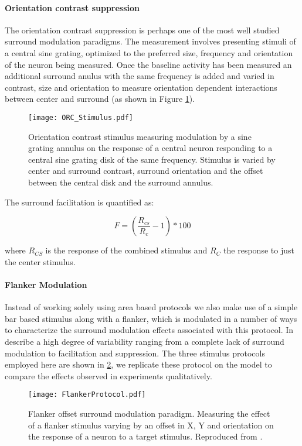 \paragraph{Orientation contrast suppression}

The orientation contrast suppression is perhaps one of the most well
studied surround modulation paradigms. The measurement involves
presenting stimuli of a central sine grating, optimized to the
preferred size, frequency and orientation of the neuron being
measured. Once the baseline activity has been measured an additional
surround anulus with the same frequency is added and varied in
contrast, size and orientation to measure orientation dependent
interactions between center and surround (as shown in Figure
\ref{ORC_Stimulus}).

\begin{figure}
	\centering
        \texttt{[image: ORC\_Stimulus.pdf]}
	\caption{Orientation contrast stimulus measuring modulation by a
      sine grating annulus on the response of a central neuron
      responding to a central sine grating disk of the same frequency.
      Stimulus is varied by center and surround contrast, surround
      orientation and the offset between the central disk and the
      surround annulus.}
	\label{ORC_Stimulus}
\end{figure}

The surround facilitation is quantified as:

\begin{equation}
F = (\frac{R_{cs}}{R_c} - 1) * 100
\end{equation}

where $R_{CS}$ is the response of the combined stimulus and $R_C$ the
response to just the center stimulus.

\paragraph{Flanker Modulation}

Instead of working solely using area based protocols we also make use
of a simple bar based stimulus along with a flanker, which is
modulated in a number of ways to characterize the surround modulation
effects associated with this protocol. In \cite{Kapadia1995} describe
a high degree of variability ranging from a complete lack of surround
modulation to facilitation and suppression. The three stimulus
protocols employed here are shown in \ref{Flanker}, we replicate these
protocol on the model to compare the effects observed in experiments
qualitatively.

\begin{figure}
	\centering
        \texttt{[image: FlankerProtocol.pdf]}
	\caption[Flanker offset stimuli. Reproduced from
      \cite{Kapadia1995}.]{Flanker offset surround modulation
      paradigm. Measuring the effect of a flanker stimulus varying by
      an offset in X, Y and orientation on the response of a neuron to
      a target stimulus. Reproduced from \cite{Kapadia1995}.}
	\label{Flanker}
\end{figure}
